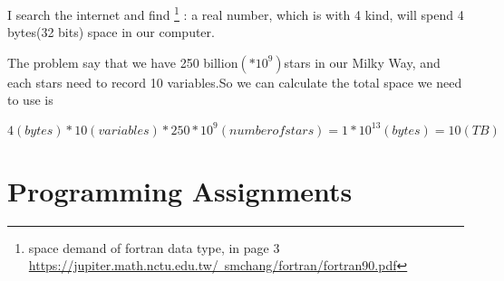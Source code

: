 \documentclass{article}
\begin{document}
I search the internet and find
\footnote{space demand of fortran data type, in page 3
\href{https://jupiter.math.nctu.edu.tw/~smchang/fortran/fortran90.pdf}{https://jupiter.math.nctu.edu.tw/~smchang/fortran/fortran90.pdf}}
: a real number, which is with 4 kind, will spend 4 bytes(32 bits) space in our computer.

The problem say that we have 250 billion$(*10^9)$stars in our Milky Way, and each stars need to record 10 variables.So we can calculate the total space we need to use is

$$    4(bytes)*10(variables)*250*10^9(number of stars)=1* 10^{13}(bytes)=10(TB) $$


\section{Programming Assignments}
\end{document}
